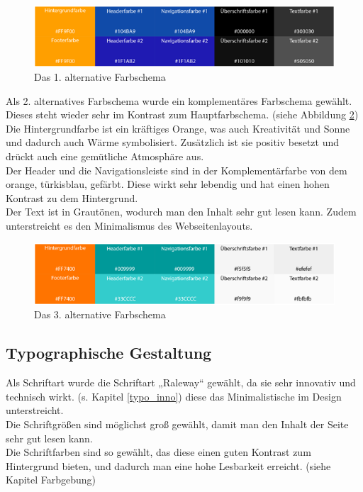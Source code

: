 \begin{figure} [hp]
\includegraphics[width=\textwidth]{./img/mini_farb2.png}
\caption{Das 1. alternative Farbschema }
\label{mini_farb2}
\end{figure}

Als 2. alternatives Farbschema wurde ein komplementäres Farbschema gewählt. Dieses steht wieder sehr im Kontrast zum Hauptfarbschema. (siehe Abbildung \ref{mini_farb3})
\\
Die Hintergrundfarbe ist ein kräftiges Orange, was auch Kreativität und Sonne und dadurch auch Wärme symbolisiert. Zusätzlich ist sie positiv besetzt und drückt auch eine gemütliche Atmosphäre aus.
\\
Der Header und die Navigationsleiste sind in der Komplementärfarbe von dem orange, türkisblau,  gefärbt. Diese wirkt sehr lebendig und hat einen hohen Kontrast zu dem Hintergrund.
\\
Der Text ist in Grautönen, wodurch man den Inhalt sehr gut lesen kann. Zudem unterstreicht es den Minimalismus des Webseitenlayouts.

\begin{figure} [hp]
\includegraphics[width=\textwidth]{./img/mini_farb3.png}
\caption{Das 3. alternative Farbschema }
\label{mini_farb3}
\end{figure}

	\subsection{Typographische Gestaltung}\label{chapter:mini:typo}

Als Schriftart wurde die Schriftart „Raleway“ gewählt, da sie sehr innovativ und technisch wirkt. (s. Kapitel \ref{typo_inno})  diese das Minimalistische im Design unterstreicht. 
\\
Die Schriftgrößen sind möglichst groß gewählt, damit man den Inhalt der Seite sehr gut lesen kann.
\\
Die Schriftfarben sind so gewählt, das diese einen guten Kontrast zum Hintergrund bieten, und dadurch man eine hohe Lesbarkeit erreicht. (siehe Kapitel Farbgebung)


